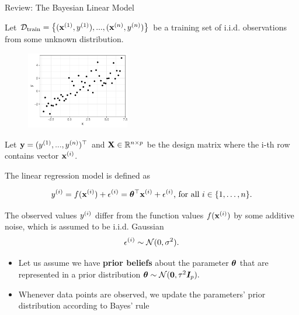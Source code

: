 \begin{frame}[c, allowframebreaks]{Review: The Bayesian Linear Model}

Let $\mathcal{D}_{\text{train}} = \left\{(\mathbf{x}^{(1)},y^{(1)}), ..., (\mathbf{x}^{(n)},y^{(n)})\right\}$ be a training set of i.i.d. observations from some unknown distribution.
\begin{figure}
  \includegraphics[width=0.4\textwidth]{figure_man/bayes-lm/example.pdf}
\end{figure}

Let $\textbf{y} = (y^{(1)}, ..., y^{(n)})^\top$ and $\mathbf{X} \in \mathbb{R}^{n \times p}$ be the design matrix where the i-th row contains vector $\mathbf{x}^{(i)}$. 





\framebreak

The linear regression model is defined as


$$
y^{(i)} = f(\mathbf{x}^{(i)}) + \epsilon^{(i)} = \bm{\theta}^\top \mathbf{x}^{(i)} + \epsilon^{(i)} \text{, for all } i \in \{1,\dots,n\}.
$$

\lz 

\lz 

The observed values $y^{(i)}$ differ from the function values $f(\mathbf{x}^{(i)})$ by some additive noise, which is assumed to be i.i.d. Gaussian 
$$\epsilon^{(i)} \sim \mathcal{N} (0, \sigma^2).$$


\framebreak
\begin{itemize}
  \item Let us assume we have \textbf{prior beliefs} about the parameter $\bm{\theta}$ that are represented in a prior distribution $\bm{\theta} \sim \mathcal{N} (\mathbf{0}, \tau^2 \boldsymbol{I}_p).$

\lz
\lz

\item Whenever data points are observed, we update the parameters' prior distribution according to Bayes' rule


\end{itemize}
\end{frame}

